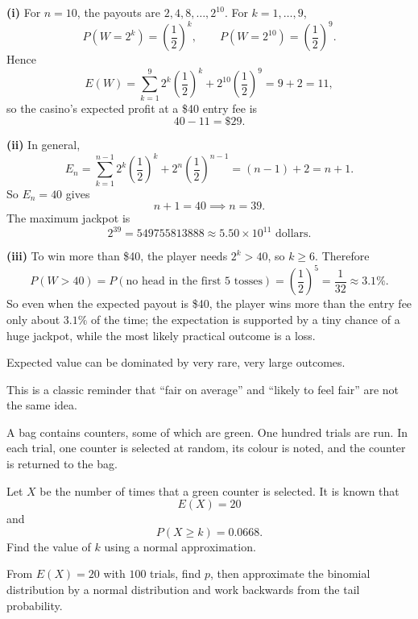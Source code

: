 \begin{solution}
\textbf{(i)} For $n=10$, the payouts are $2,4,8,\dots,2^{10}$. For $k=1,\dots,9$,
\[
P(W=2^k)=\left(\frac12\right)^k,
\qquad
P(W=2^{10})=\left(\frac12\right)^9.
\]
Hence
\[
E(W)=\sum_{k=1}^{9}2^k\left(\frac12\right)^k+2^{10}\left(\frac12\right)^9
=9+2=11,
\]
so the casino's expected profit at a \$40 entry fee is
\[
40-11=\$29.
\]

\textbf{(ii)} In general,
\[
E_n=\sum_{k=1}^{n-1}2^k\left(\frac12\right)^k+2^n\left(\frac12\right)^{n-1}
=(n-1)+2=n+1.
\]
So $E_n=40$ gives
\[
n+1=40 \implies n=39.
\]
The maximum jackpot is
\[
2^{39}=549755813888\approx 5.50\times 10^{11}\text{ dollars.}
\]

\textbf{(iii)} To win more than \$40, the player needs $2^k>40$, so $k\ge 6$. Therefore
\[
P(W>40)=P(\text{no head in the first 5 tosses})=\left(\frac12\right)^5=\frac1{32}\approx 3.1\%.
\]
So even when the expected payout is \$40, the player wins more than the entry fee only about $3.1\%$ of the time; the expectation is supported by a tiny chance of a huge jackpot, while the most likely practical outcome is a loss.
\end{solution}

\begin{takeaways}
\item Expected value can be dominated by very rare, very large outcomes.
\item This is a classic reminder that ``fair on average'' and ``likely to feel fair'' are not the same idea.
\end{takeaways}

\begin{problem}
A bag contains counters, some of which are green. One hundred trials are run. In each trial, one counter is selected at random, its colour is noted, and the counter is returned to the bag.

Let $X$ be the number of times that a green counter is selected. It is known that
\[
E(X)=20
\]
and
\[
P(X\ge k)=0.0668.
\]
Find the value of $k$ using a normal approximation.
\end{problem}

\begin{hint}
From $E(X)=20$ with $100$ trials, find $p$, then approximate the binomial distribution by a normal distribution and work backwards from the tail probability.
\end{hint}

